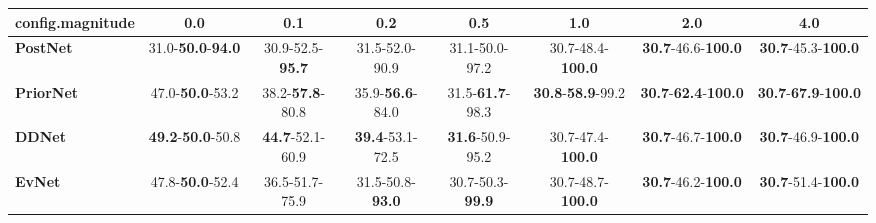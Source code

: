 \begin{tabular}{lccccccc}
\toprule
\textbf{config.magnitude} &                               0.0 &                      0.1 &                      0.2 &                      0.5 &                               1.0 &                                         2.0 &                                         4.0 \\
\midrule
\textbf{PostNet } &  31.0-\textbf{50.0}-\textbf{94.0} &  30.9-52.5-\textbf{95.7} &           31.5-52.0-90.9 &           31.1-50.0-97.2 &          30.7-48.4-\textbf{100.0} &           \textbf{30.7}-46.6-\textbf{100.0} &           \textbf{30.7}-45.3-\textbf{100.0} \\
\textbf{PriorNet} &           47.0-\textbf{50.0}-53.2 &  38.2-\textbf{57.8}-80.8 &  35.9-\textbf{56.6}-84.0 &  31.5-\textbf{61.7}-98.3 &  \textbf{30.8}-\textbf{58.9}-99.2 &  \textbf{30.7}-\textbf{62.4}-\textbf{100.0} &  \textbf{30.7}-\textbf{67.9}-\textbf{100.0} \\
\textbf{DDNet   } &  \textbf{49.2}-\textbf{50.0}-50.8 &  \textbf{44.7}-52.1-60.9 &  \textbf{39.4}-53.1-72.5 &  \textbf{31.6}-50.9-95.2 &          30.7-47.4-\textbf{100.0} &           \textbf{30.7}-46.7-\textbf{100.0} &           \textbf{30.7}-46.9-\textbf{100.0} \\
\textbf{EvNet   } &           47.8-\textbf{50.0}-52.4 &           36.5-51.7-75.9 &  31.5-50.8-\textbf{93.0} &  30.7-50.3-\textbf{99.9} &          30.7-48.7-\textbf{100.0} &           \textbf{30.7}-46.2-\textbf{100.0} &           \textbf{30.7}-51.4-\textbf{100.0} \\
\bottomrule
\end{tabular}

